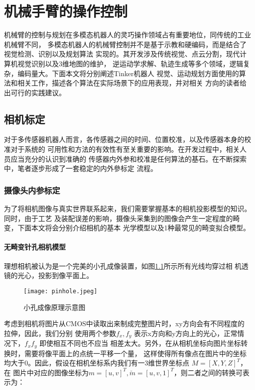\chapter{机械手臂的操作控制}
\label{cha:arm}

机械臂的控制与规划在多模态机器人的灵巧操作领域占有重要地位，同传统的工业机械臂不同，
多模态机器人的机械臂控制并不是基于示教和硬编码，而是结合了视觉检测、识别以及规划算法
实现的。其开发涉及传统视觉、点云分割，现代计算机视觉识别以及3维地图的维护，
逆运动学求解、轨迹生成等多个领域，逻辑复杂，编码量大。下面本文将分别阐述Tinker机器人
视觉、运动规划方面使用的算法和相关工作，描述各个算法在实际场景下的应用表现，并对相关
方向的读者给出可行的实践建议。

\section{相机标定}

对于多传感器机器人而言，各传感器之间的时间、位置校准，以及传感器本身的校准对于系统的
可用性和方法的有效性有至关重要的影响。在开发过程中，相关人员应当充分的认识到准确的
传感器内外参和校准是任何算法的基石。在不断探索中，笔者逐步形成了一套稳定的内外參标定
流程。

\subsection{摄像头内参标定}
\label{subsec:cam_intrinsic}

为了将相机图像与真实世界联系起来，我们需要掌握基本的相机投影模型的知识。同时，由于工艺
及装配误差的影响，摄像头采集到的图像会产生一定程度的畸变，下面本文将会分别介绍相机的基本
光学模型以及1种最常见的畸变拟合模型。

\subsubsection{无畸变针孔相机模型}

理想相机被认为是一个完美的小孔成像装置，如图\ref{fig:pinhole}所示所有光线均穿过相
机透镜的光心，投影到像平面上。

\begin{figure}[h] %
  \centering
  \texttt{[image: pinhole.jpeg]}
  \caption{小孔成像原理示意图}
  \label{fig:pinhole}
\end{figure}

考虑到相机将图片从CMOS中读取出来制成完整图片时，xy方向会有不同程度的拉伸，因此，我们分别
使用两个参数$f_x, f_y$ 表示x方向和y方向上的光心，正常情况下，$f_x f_y$ 即使相互不同也不应当
相差太大。另外，在从相机坐标向图片坐标转换时，需要将像平面上的点统一平移一个量，
这样使得所有像点在图片中的坐标均大于0。因此，假设在相机坐标系内我们有一3维世界坐标点
$M = [X, Y, Z]^T$，在
图片中对应的图像坐标为$m = [u, v]^T, \breve{m} = [u, v, 1]^T$，则二者之间的转换可表示为：

